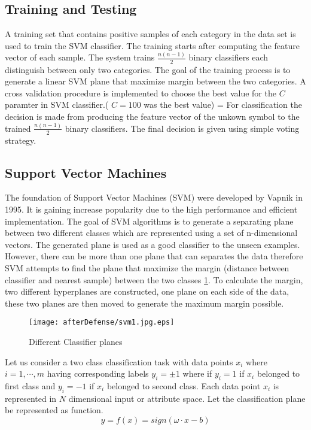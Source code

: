 \subsection {Training and Testing}
A training set that contains positive samples of each category in the data set is used to train the SVM classifier.  The training starts after computing the feature vector of each sample. The system trains $ \frac{n(n-1)}{{2}}$ binary classifiers each distinguish between only two categories. The goal of the training process is to generate a linear SVM plane that maximize margin between the two categories.  A cross validation procedure is implemented to choose the best value for the $C$ paramter in SVM classifier.( $C=100$ was the best value) 
=
For classification the decision is made from  producing the feature vector of the unkown symbol to the trained $\frac{n(n-1)}{{2}}$ binary classifiers. The final decision is given using simple voting strategy. 



\subsection{Support Vector Machines}
\label{Sec:SVMdetail}
The foundation of Support Vector Machines (SVM) were developed by Vapnik \cite{svmintroduce} in 1995. It is gaining increase popularity due to the high performance and efficient implementation. The goal of SVM algorithms is to generate a separating plane between two different classes which are represented using a set of n-dimensional vectors. The generated plane is used as a good classifier to the unseen examples. However, there can be more than one plane that can separates the data therefore SVM attempts to find the plane that maximize the margin (distance between classifier and nearest sample) between the two classes \ref{fig:svm1}. To calculate the margin, two different hyperplanes are constructed, one plane on each side of the data, these two planes are then moved to generate the maximum margin possible.  
\begin{figure}
	\centering
		\texttt{[image: afterDefense/svm1.jpg.eps]}
	\caption{Different Classifier planes }
	\label{fig:svm1}
\end{figure}


Let us consider  a two class classification task with data points $x_i$ where $i=1,\cdots,m$ having corresponding labels $y_i=\pm1$ where if  $y_i=1$ if $x_i$ belonged to first class and $y_i=-1$ if $x_i$ belonged to second class. Each data  point $x_i$ is represented in $N$ dimensional input or attribute space. Let the classification plane be represented as function. 
\begin{equation}
 y=f(x)=sign(\omega \cdot x - b)
\label{eq:planeEq}
\end{equation}

